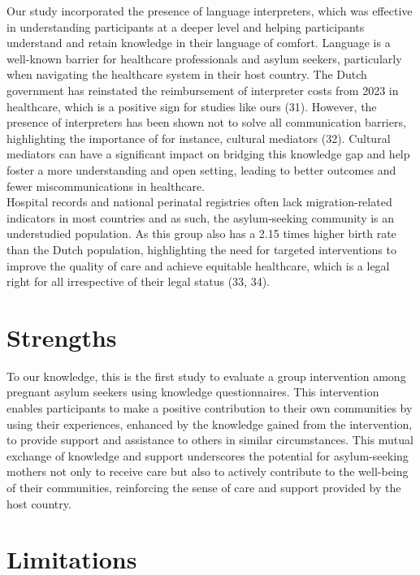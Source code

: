 \documentclass[12pt]{article}
\begin{document}
\noindent Our study incorporated the presence of language interpreters, which was effective in understanding participants at a deeper level and helping participants understand and retain knowledge in their language of comfort. Language is a well-known barrier for healthcare professionals and asylum seekers, particularly when navigating the healthcare system in their host country. The Dutch government has reinstated the reimbursement of interpreter costs from 2023 in healthcare, which is a positive sign for studies like ours (31). However, the presence of interpreters has been shown not to solve all communication barriers, highlighting the importance of for instance, cultural mediators (32). Cultural mediators can have a significant impact on bridging this knowledge gap and help foster a more understanding and open setting, leading to better outcomes and fewer miscommunications in healthcare. \\

\noindent Hospital records and national perinatal registries often lack migration-related indicators in most countries and as such, the asylum-seeking community is an understudied population. As this group also has a 2.15 times higher birth rate than the Dutch population, highlighting the need for targeted interventions to improve the quality of care and achieve equitable healthcare, which is a legal right for all irrespective of their legal status (33, 34). 

\section{Strengths}

\noindent To our knowledge, this is the first study to evaluate a group intervention among pregnant asylum seekers using knowledge questionnaires. This intervention enables participants to make a positive contribution to their own communities by using their experiences, enhanced by the knowledge gained from the intervention, to provide support and assistance to others in similar circumstances. This mutual exchange of knowledge and support underscores the potential for asylum-seeking mothers not only to receive care but also to actively contribute to the well-being of their communities, reinforcing the sense of care and support provided by the host country.

\section{Limitations}
\end{document}

